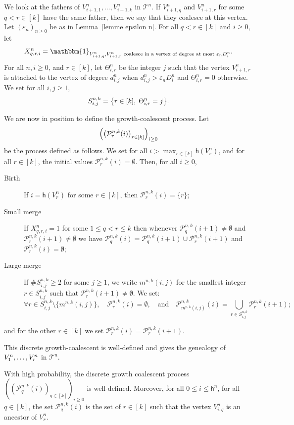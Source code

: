\documentclass[AHL,Unicode,published]{cedram}
\newcommand{\e}{\varepsilon}
\newcommand{\1}{\mathbbm{1}}
\newcommand{\Part}{\mathcal{P}}
\newcommand{\T}{\mathcal{T}}
\newcommand{\h}{\mathsf{h}}
\let\originalleft\left
\let\originalright\right
\renewcommand{\left}{\mathopen{}\mathclose\bgroup\originalleft}
\renewcommand{\right}{\aftergroup\egroup\originalright}
\let\oldforall\forall
\renewcommand*{\forall}{\mathrel{\oldforall}}
\begin{document}
We look at the fathers of $V^n_{i+1,1}, \dots,V^n_{i+1,k}$ in $\T^n$. If $V^n_{i+1,q}$ and $V^n_{i+1,r}$ for some $q<r \in [k]$ have the same father, then we say that they coalesce at this vertex. Let $(\e_n)_{n\ge 0}$ be as in Lemma~\ref{lemme epsilon n}. For all $q<r \in [k]$ and $i \ge 0$, let
\begin{equation}\label{eq indicatrice petite coalescence}
X^n_{q,r,i} = \1_{V^n_{i+1,q}, V^n_{i+1,r}
\text{ coalesce in a vertex of degree at most } \e_n D^n_i}.
\end{equation}
For all $n,i\ge 0$, and $r \in [k]$, let $\Theta_{i,r}^n$ be the integer $j$ such that the vertex $V^n_{i+1,r}$ is attached to the vertex of degree $d^n_{i,j}$ when $d^n_{i,j}> \e_n D^n_i$ and $\Theta_{i,r}^n=0$ otherwise. We set for all $i,j \ge 1$,
\[
S^{n,k}_{i,j} = \left\{ r \in [k], \; \Theta^n_{i,r}=j\right\}.
\]

We are now in position to define the growth-coalescent process. Let 
\[
\left(\left(\Part^{n,k}_r(i)\right)_{r \in [k]}\right)_{i\ge 0}
\]
be the process defined as follows. We set for all $i >\max_{r \in [k]} \h(V^n_r)$, and for all $r \in [k]$, the initial values $ \Part^{n,k}_r(i) = \emptyset$. Then, for all $i\ge 0$,
\begin{description}
\item[{Birth}] If $i=\h(V^n_r)$ for some $r \in [k]$, then $\Part_r^{n,k}(i)=\{r\}$;
\item[{Small merge}] If $X^n_{q,r,i}=1$ for some $1 \le q<r\le k$ then whenever $\Part_q^{n,k}(i+1)\neq \emptyset$ and $\Part_{r}^{n,k}(i+1)\neq \emptyset$ we have $\Part_q^{n,k}(i)=\Part_q^{n,k}(i+1)\cup \Part_{r}^{n,k}(i+1)$ and $\Part_r^{n,k}(i)=\emptyset$;
\item[{Large merge}] If $\# S^{n,k}_{i,j} \ge 2$ for some $j\ge 1$, we write $m^{n,k}(i,j)$ for the smallest integer $r\in S^{n,k}_{i,j}$ such that $\Part_r^{n,k}(i+1)\neq \emptyset$. We set:
\[
\forall r \in S^{n,k}_{i,j} \setminus \{ m^{n,k}(i,j)\}, \quad \Part_r^{n,k}(i)=\emptyset, \quad \text{and} \quad \Part_{m^{n,k}(i,j)}^{n,k}(i)=\bigcup_{r\in S^{n,k}_{i,j}} \Part_{r}^{n,k}(i+1);
\]
\end{description}
and for the other $r \in [k]$ we set $\Part_r^{n,k}(i)= \Part_r^{n,k} (i+1)$.

This discrete growth-coalescent is well-defined and gives the genealogy of $V^n_1, \dots,\linebreak V^n_r$ in $\T^n$.

\begin{prop}
With high probability, the discrete growth coalescent process $(( \Part^{n,k}_q(i))_{q \in [k]})_{i\ge 0}$ is well-defined. Moreover, for all $0 \le i \le \h^n$, {for all $q \in [k]$,} the set $ \Part^{n,k}_q(i)$ is the set of $r \in [k]$ such that the vertex $V^n_{i,q}$ is an ancestor of $V^n_r$.
\end{prop}
\end{document}
